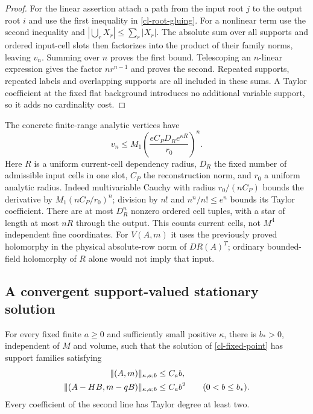 \begin{proof}
For the linear assertion attach a path from the input root $j$ to the
output root $i$ and use the first inequality in
\eqref{cl-root-gluing}. For a nonlinear term use the second inequality
and
$|\bigcup_rX_r|\le\sum_r|X_r|$.
The absolute sum over all supports and ordered input-cell slots then
factorizes into the product of their family norms, leaving $v_n$.
Summing over $n$ proves the first bound. Telescoping an $n$-linear
expression gives the factor $n r^{n-1}$ and proves the second.
Repeated supports, repeated labels and overlapping supports are all
included in these sums. A Taylor coefficient at the fixed flat
background introduces no additional variable support, so it adds no
cardinality cost.
\end{proof}

The concrete finite-range analytic vertices have
\begin{equation}
 v_n\le M_1
       \left(\frac{eC_PD_Re^{\kappa R}}{r_0}\right)^n.        \label{cl-local-cauchy}
\end{equation}
Here $R$ is a uniform current-cell dependency radius, $D_R$ the fixed
number of admissible input cells in one slot, $C_P$ the reconstruction
norm, and $r_0$ a uniform analytic radius. Indeed multivariable Cauchy
with radius $r_0/(nC_P)$ bounds the derivative by
$M_1(nC_P/r_0)^n$; division by $n!$ and $n^n/n!\le e^n$ bounds its
Taylor coefficient. There are at most $D_R^n$ nonzero ordered cell
tuples, with a star of length at most $nR$ through the output.
This counts current cells, not $M^4$ independent fine coordinates.
For $V(A,m)$ it uses the previously proved holomorphy in the physical
absolute-row norm of $DR(A)^T$; ordinary bounded-field holomorphy of
$R$ alone would not imply that input.

\subsection{A convergent support-valued stationary solution}
\label{cl-contraction-section}

\begin{theorem}
\label{cl-fixed-point-theorem}
For every fixed finite $a\ge0$ and sufficiently small positive
$\kappa$, there is $b_*>0$, independent of $M$ and volume, such that
the solution of \eqref{cl-fixed-point} has support families satisfying
\begin{align}
 \|(A,m)\|_{\kappa,a;b}&\le C_a b,\notag\\
 \|(A-HB,m-qB)\|_{\kappa,a;b}&\le C_a b^2
 \qquad(0<b\le b_*).                                      \label{cl-solution-bound}
\end{align}
Every coefficient of the second line has Taylor degree at least two.
\end{theorem}

